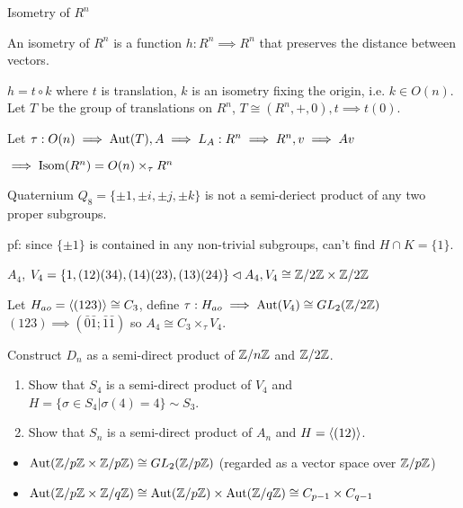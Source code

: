 \begin{example}
Isometry of $R^n$
\end{example}

\begin{definition}[Isometry]
An isometry of $R^n$ is a function $h: R^n \implies R^n$ that preserves the distance between vectors.
\end{definition}
$h = t \circ k$ where $t$ is translation, $k$ is an isometry fixing the origin, i.e. $k \in O(n)$.
Let $T$ be the group of translations on $R^n$, $T \cong (R^n, +, 0), t \implies t(0)$.

Let $\tau : O(n) \implies \operatorname{Aut}(T), A \implies L_A : R^n \implies R^n, v \implies Av$

$\implies \operatorname{Isom}(R^n) = O(n) \times_\tau R^n$

\begin{example}
Quaternium $Q_8 = \{\pm 1, \pm i, \pm j, \pm k\}$ is not a semi-deriect product of any two proper subgroups.
\end{example}
pf: since $\{\pm 1\}$ is contained in any non-trivial subgroups, can't find $H \cap K = \{1\}$.

\begin{example}
$A_4$, $V_4 = \{1, (12)(34), (14)(23), (13)(24)\} \lhd A_4, V_4 \cong \mathbb{Z}/2\mathbb{Z} \times \mathbb{Z}/2\mathbb{Z}$
\end{example}
Let $H_{ao} = \langle(123)\rangle \cong C_3$, define $\tau : H_{ao} \implies \operatorname{Aut}(V_4) \cong GL_2(\mathbb{Z}/2\mathbb{Z})$
$(123) \implies (\bar{0} \bar{1}; \bar{1} \bar{1})$
so $A_4 \cong C_3 \times_\tau V_4$.

\begin{exercise}
Construct $D_n$ as a semi-direct product of $\mathbb{Z}/n\mathbb{Z}$ and $\mathbb{Z}/2\mathbb{Z}$.
\end{exercise}

\begin{exercise}
  \begin{enumerate}
    \item Show that $S_4$ is a semi-direct product of $V_4$ and $H = \{\sigma \in S_4 | \sigma(4) = 4\} \sim S_3$.
    \item Show that $S_n$ is a semi-direct product of $A_n$ and $H = \langle(12)\rangle$.
  \end{enumerate}
\end{exercise}

\begin{remark}
  \begin{itemize}
    \item $\operatorname{Aut}(\mathbb{Z}/p\mathbb{Z} \times \mathbb{Z}/p\mathbb{Z}) \cong GL_2(\mathbb{Z}/p\mathbb{Z})$ (regarded as a vector space over $\mathbb{Z}/p\mathbb{Z}$)
    \item $\operatorname{Aut}(\mathbb{Z}/p\mathbb{Z} \times \mathbb{Z}/q\mathbb{Z}) \cong \operatorname{Aut}(\mathbb{Z}/p\mathbb{Z}) \times \operatorname{Aut}(\mathbb{Z}/q\mathbb{Z}) \cong C_{p-1} \times C_{q-1}$
  \end{itemize}
\end{remark}
